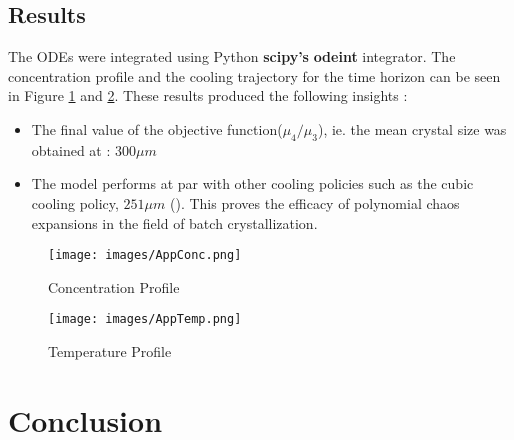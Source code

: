 \documentclass[3p,times,authoryear]{elsarticle}
\begin{document}
\subsection{Results}

The ODEs were integrated using Python \textbf{scipy's} \textbf{odeint} integrator.
The concentration profile and the cooling trajectory for the time horizon can be seen in Figure \ref{AppConc} and \ref{AppTemp}.
These results produced the following insights : 

\begin{itemize}
\item The final value of the objective function($\mu_{4}/\mu_{3}$), ie. the mean crystal size was obtained at : $300 \mu m$
\item The model performs at par with other cooling policies such as the cubic cooling policy, $251 \mu m$ (\cite{bhoi}). This proves the efficacy of polynomial chaos expansions in the field of batch crystallization.
\end{itemize}

\begin{figure}[h!] 
\begin{center}

\texttt{[image: images/AppConc.png]}
\end{center}
\caption{Concentration Profile} \label{AppConc}
\end{figure}

\begin{figure}[h!] 
\begin{center}
\texttt{[image: images/AppTemp.png]}
\end{center}
\caption{Temperature Profile} \label{AppTemp}
\end{figure}



\section{Conclusion}
\end{document}
